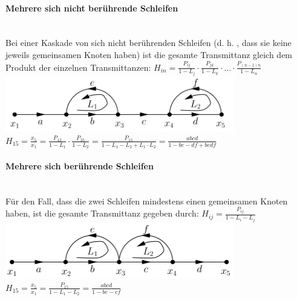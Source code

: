 \begin{multicols}{2}
			  \paragraph{Mehrere sich nicht berührende Schleifen} \ \\
				  Bei einer Kaskade von sich nicht berührenden Schleifen (d. h. , dass sie keine jeweils gemeinsamen Knoten haben) ist die gesamte Transmittanz gleich dem Produkt der einzelnen Transmittanzen: $H_{in}=\frac{P_{ij}}{1-L_j}\cdot\frac{P_{jk}}{1-L_k}\cdot\ldots\cdot\frac{P_{(n-1)n}}{1-L_n}$ \\
				  \includegraphics[width=10cm]{./bilder/schleifenreduktion_nichtberuehrend.png} \\
				  $H_{15}=\frac{x_5}{x_1}=\frac{P_{13}}{1-L_1}\cdot\frac{P_{35}}{1-L_2}=\frac{P_{15}}{1-L_1-L_2+L_1\cdot L_2}=\frac{abcd}{1-be-df+bedf}$
				  
			  \paragraph{Mehrere sich berührende Schleifen} \ \\
			      Für den Fall, dass die zwei Schleifen mindestens einen gemeinsamen Knoten haben, ist die gesamte Transmittanz gegeben durch: $H_{ij}=\frac{P_{ij}}{1-L_i-L_j}$ \\
			      \includegraphics[width=10cm]{./bilder/schleifenreduktion_beruehrend.png} \\
			      $H_{15}=\frac{x_5}{x_1}=\frac{P_{15}}{1-L_1-L_2}=\frac{abcd}{1-be-cf}$
			      

\end{multicols}
